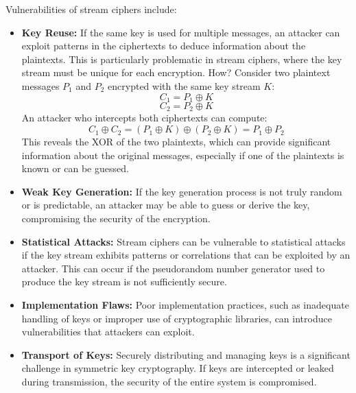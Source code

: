 \documentclass[openany]{book}
\begin{document}
\begin{mynote}
    Vulnerabilities of stream ciphers include:
    \begin{itemize}
        \item \textbf{Key Reuse:} If the same key is used for multiple messages, an attacker can exploit patterns in the ciphertexts to deduce information about the plaintexts. This is particularly problematic in stream ciphers, where the key stream must be unique for each encryption.
        How? Consider two plaintext messages \( P_1 \) and \( P_2 \) encrypted with the same key stream \( K \):
        \[ C_1 = P_1 \oplus K \]
        \[ C_2 = P_2 \oplus K \]
        An attacker who intercepts both ciphertexts can compute:
        \[ C_1 \oplus C_2 = (P_1 \oplus K) \oplus (P_2 \oplus K) = P_1 \oplus P_2 \]
        This reveals the XOR of the two plaintexts, which can provide significant information about the original messages, especially if one of the plaintexts is known or can be guessed.
        \item \textbf{Weak Key Generation:} If the key generation process is not truly random or is predictable, an attacker may be able to guess or derive the key, compromising the security of the encryption.
        \item \textbf{Statistical Attacks:} Stream ciphers can be vulnerable to statistical attacks if the key stream exhibits patterns or correlations that can be exploited by an attacker. This can occur if the pseudorandom number generator used to produce the key stream is not sufficiently secure.
        \item \textbf{Implementation Flaws:} Poor implementation practices, such as inadequate handling of keys or improper use of cryptographic libraries, can introduce vulnerabilities that attackers can exploit.
        \item \textbf{Transport of Keys:} Securely distributing and managing keys is a significant challenge in symmetric key cryptography. If keys are intercepted or leaked during transmission, the security of the entire system is compromised.
    \end{itemize}
\end{mynote}
\end{document}
